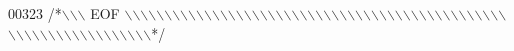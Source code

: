\begin{DoxyCode}
00323 \textcolor{comment}{/*\(\backslash\)\(\backslash\)\(\backslash\) EOF \(\backslash\)\(\backslash\)\(\backslash\)\(\backslash\)\(\backslash\)\(\backslash\)\(\backslash\)\(\backslash\)\(\backslash\)\(\backslash\)\(\backslash\)\(\backslash\)\(\backslash\)\(\backslash\)\(\backslash\)\(\backslash\)\(\backslash\)\(\backslash\)\(\backslash\)\(\backslash\)\(\backslash\)\(\backslash\)\(\backslash\)\(\backslash\)\(\backslash\)\(\backslash\)\(\backslash\)\(\backslash\)\(\backslash\)\(\backslash\)\(\backslash\)\(\backslash\)\(\backslash\)\(\backslash\)\(\backslash\)\(\backslash\)\(\backslash\)\(\backslash\)\(\backslash\)\(\backslash\)\(\backslash\)\(\backslash\)\(\backslash\)\(\backslash\)\(\backslash\)\(\backslash\)\(\backslash\)\(\backslash\)\(\backslash\)\(\backslash\)\(\backslash\)\(\backslash\)\(\backslash\)\(\backslash\)\(\backslash\)\(\backslash\)\(\backslash\)\(\backslash\)\(\backslash\)\(\backslash\)\(\backslash\)\(\backslash\)\(\backslash\)\(\backslash\)\(\backslash\)\(\backslash\)*/}
\end{DoxyCode}
